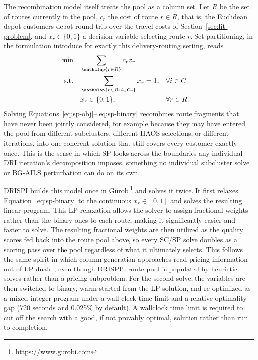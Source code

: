 The recombination model itself treats the pool as a column set. Let $R$ be the set of routes currently in the pool, $c_r$ the cost of route $r \in R$, that is, the Euclidean depot-customers-depot round trip over the travel costs of Section~\ref{sec:lit-problem}, and $x_r \in \{0, 1\}$ a decision variable selecting route $r$. Set partitioning, in the formulation \citet{balinskiIntegerProgramDelivery1964} introduce for exactly this delivery-routing setting, reads
\begin{align}
\text{min} \quad & \sum_{\mathclap{r \in R}} c_r x_r \label{eq:sp-obj}\\
\text{s.t.} \quad & \sum_{\mathclap{r \in R:\, i \in C_r}} x_r = 1, && \forall i \in C \label{eq:sp-partition}\\
& x_r \in \{0, 1\}, && \forall r \in R. \label{eq:sp-binary}
\end{align}
Solving Equations~\ref{eq:sp-obj}--\ref{eq:sp-binary} recombines route fragments that have never been jointly considered, for example because they may have entered the pool from different subclusters, different HAOS selections, or different iterations, into one coherent solution that still covers every customer exactly once. This is the sense in which SP looks across the boundaries any individual DRI iteration's decomposition imposes, something no individual subcluster solve or BG-AILS perturbation can do on its own.

DRISPI builds this model once in Gurobi\footnote{\url{https://www.gurobi.com}} and solves it twice. It first relaxes Equation~\ref{eq:sp-binary} to the continuous $x_r \in [0, 1]$ and solves the resulting linear program. This LP relaxation allows the solver to assign fractional weights rather than the binary ones to each route, making it significantly easier and faster to solve. The resulting fractional weights are then utilized as the quality scores fed back into the route pool above, so every SC/SP solve doubles as a scoring pass over the pool regardless of what it ultimately selects. This follows the same spirit in which column-generation approaches read pricing information out of LP duals \citep{lubbeckeSelectedTopicsColumn2005}, even though DRISPI's route pool is populated by heuristic solves rather than a pricing subproblem. For the second solve, the variables are then switched to binary, warm-started from the LP solution, and re-optimized as a mixed-integer program under a wall-clock time limit and a relative optimality gap (720 seconds and 0.025\% by default). A wallclock time limit is required to cut off the search with a good, if not provably optimal, solution rather than run to completion.

